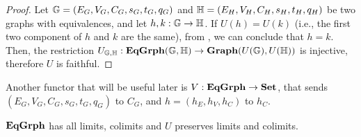 \begin{proof}
    Let $\mathbb{G} = (E_G, V_G, C_G, s_G, t_G, q_G)$ and $\mathbb{H} = (E_H, V_H, C_H, s_H, t_H, q_H)$  be two graphs with equivalences, and let $h, k : \mathbb{G \to H}$.
    If $U(h) = U(k)$ (i.e., the first two component of $h$ and $k$ are the same), from , we can conclude that $h = k$. Then, the restriction $U_{\mathbb{G, H}} : \mathbf{EqGrph}(\mathbb{G, H}) \to \mathbf{Graph}(U(\mathbb{G}), U(\mathbb{H}))$ is injective, therefore $U$ is faithful.
\end{proof}

Another functor that will be useful later is $V: \mathbf{EqGrph} \to \mathbf{Set}$, that sends $(E_G, V_G, C_G, s_G, t_G, q_G)$ to $C_G$, and $h = (h_E, h_V, h_C)$ to $h_C$.

\begin{prop}\label{prop:eqgrph_complete}
    $\mathbf{EqGrph}$ has all limits, colimits and $U$ preserves limits and colimits.
\end{prop}

